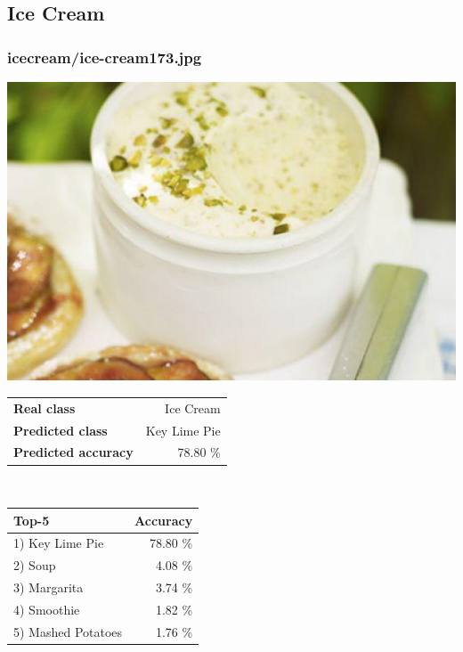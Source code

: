 \subsection{Ice Cream}
    
\subsubsection{ice\textunderscore cream/ice-cream173.jpg}

\begin{minipage}[t]{0.4\textwidth}
	\vspace{0pt}
	\includegraphics[width=\linewidth]{images/evaluation-images/ice_cream/ice-cream173.jpg}
\end{minipage}
\hfill
\begin{minipage}[t]{0.5\textwidth}
	\vspace{0pt}\raggedright
	\begin{tabularx}{\textwidth}{X r}
		\small \textbf{Real class} & \small Ice Cream\\
		\small \textbf{Predicted class} & \small Key Lime Pie\\
		\small \textbf{Predicted accuracy} & \small 78.80 \%
    \end{tabularx}\\
    
    \vspace{6pt}
	\begin{tabularx}{\textwidth}{X r}
        \small \textbf{Top-5} & \small \textbf{Accuracy} \\
        \hline
		\small 1) Key Lime Pie & \small 78.80 \%\\\small 2) Soup & \small 4.08 \%\\\small 3) Margarita & \small 3.74 \%\\\small 4) Smoothie & \small 1.82 \%\\\small 5) Mashed Potatoes & \small 1.76 \%
    \end{tabularx}
\end{minipage}
    
